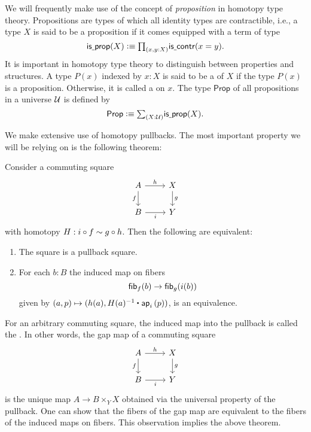 \documentclass[9pt,twosided]{amsart}
\begin{document}
We will frequently make use of the concept of \emph{proposition} in homotopy type theory. Propositions are types of which all identity types are contractible, i.e., a type $X$ is said to be a proposition if it comes equipped with a term of type
\begin{equation*}
  \isprop(X)\defeq\prd{x,y:X}\iscontr(x=y).
\end{equation*}
It is important in homotopy type theory to distinguish between properties and structures. A type $P(x)$ indexed by $x:X$ is said to be a  of $X$ if the type $P(x)$ is a proposition. Otherwise, it is called a  on $x$. The type $\mathsf{Prop}$ of all propositions in a universe $\mathcal{U}$ is defined by
\begin{equation*}
  \mathsf{Prop}\defeq \sm{X:\UU}\isprop(X).
\end{equation*}

We make extensive use of homotopy pullbacks. The most important property we will be relying on is the following theorem:

\begin{thm}\label{thm:pullback}
  Consider a commuting square
  \begin{equation*}
    \begin{tikzcd}
      A \arrow[r,"h"] \arrow[d,swap,"f"] & X \arrow[d,"g"] \\
      B \arrow[r,swap,"i"] & Y
    \end{tikzcd}
  \end{equation*}
  with homotopy $H:i\circ f\sim g\circ h$. Then the following are equivalent:
  \begin{enumerate}
  \item The square is a pullback square.
  \item For each $b:B$ the induced map on fibers
    \begin{equation*}
      \fib{f}{b} \to \fib{g}{i(b)}
    \end{equation*}
    given by $(a,p)\mapsto (h(a),\ct{H(a)^{-1}}{\ap{i}{p}})$, is an equivalence.
  \end{enumerate}
\end{thm}

For an arbitrary commuting square, the induced map into the pullback is called the . In other words, the gap map of a commuting square
  \begin{equation*}
    \begin{tikzcd}
      A \arrow[r,"h"] \arrow[d,swap,"f"] & X \arrow[d,"g"] \\
      B \arrow[r,swap,"i"] & Y
    \end{tikzcd}
  \end{equation*}
is the unique map $A\to B\times_Y X$ obtained via the universal property of the pullback. One can show that the fibers of the gap map are equivalent to the fibers of the induced maps on fibers. This observation implies the above theorem.
\end{document}
